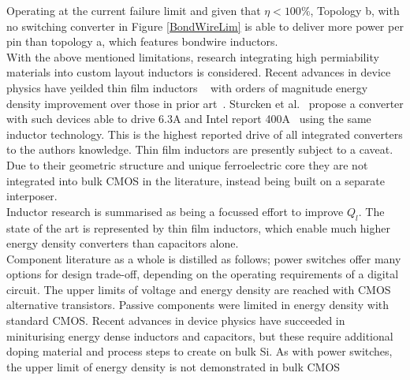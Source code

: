 \documentclass[letterpaper,twocolumn,10pt]{article}
\begin{document}
Operating at the current failure limit and given that $\eta < 100 \%$, Topology b, with no switching converter in Figure \ref{BondWireLim} is able to deliver more power per pin than topology a, which features bondwire inductors.\\
\indent With the above mentioned limitations, research integrating high permiability materials into custom layout inductors is considered. Recent advances in device physics have yeilded thin film inductors ~\cite{OSulivan2013} with orders of magnitude energy density improvement over those in prior art~\cite{Meere2009}. Sturcken et al.~\cite{Sturcken2013} propose a converter with such devices able to drive 6.3A and Intel report 400A~\cite{Intel2010} using the same inductor technology. This is the highest reported drive of all integrated converters to the authors knowledge. Thin film inductors are presently subject to a caveat. Due to their geometric structure and unique ferroelectric core they are not integrated into bulk CMOS in the literature, instead being built on a separate interposer.\\
\indent Inductor research is summarised as being a focussed effort to improve $Q_l$. The state of the art is represented by thin film inductors, which enable much higher energy density converters than capacitors alone.\\


\indent Component literature as a whole is distilled as follows; power switches offer many options for design trade-off, depending on the operating requirements of a digital circuit. The upper limits of voltage and energy density are reached with CMOS alternative transistors. Passive components were limited in energy density with standard CMOS. Recent advances in device physics have succeeded in miniturising energy dense inductors and capacitors, but these require additional doping material and process steps to create on bulk Si. As with power switches, the upper limit of energy density is not demonstrated in bulk CMOS\\
\end{document}
